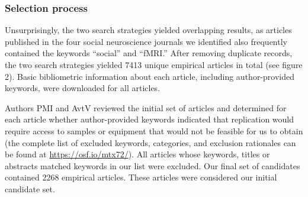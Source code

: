 \documentclass[
  english,
  man,floatsintext]{apa6}
\begin{document}
\hypertarget{selection-process}{%
\subsubsection{Selection process}\label{selection-process}}

Unsurprisingly, the two search strategies yielded overlapping results, as articles published in the four social neuroscience journals we identified also frequently contained the keywords ``social'' and ``fMRI.'' After removing duplicate records, the two search strategies yielded 7413 unique empirical articles in total (see figure 2). Basic bibliometric information about each article, including author-provided keywords, were downloaded for all articles.

Authors PMI and AvtV reviewed the initial set of articles and determined for each article whether author-provided keywords indicated that replication would require access to samples or equipment that would not be feasible for us to obtain (the complete list of excluded keywords, categories, and exclusion rationales can be found at \url{https://osf.io/mtx72/}). All articles whose keywords, titles or abstracts matched keywords in our list were excluded. Our final set of candidates contained 2268 empirical articles. These articles were considered our initial candidate set.
\end{document}
